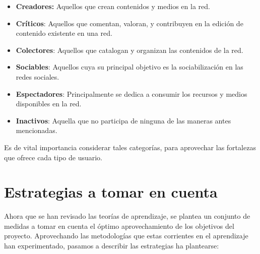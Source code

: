 \begin{itemize}
\item \textbf{Creadores:} Aquellos que crean contenidos y medios en la red.
\item \textbf{Críticos}: Aquellos que comentan, valoran, y contribuyen en la
      edición de contenido existente en una red.
\item \textbf{Colectores}: Aquellos que catalogan y organizan las contenidos de
      la red.
\item \textbf{Sociables}: Aquellos cuya su principal objetivo es la
      sociabilización en las redes sociales.
\item \textbf{Espectadores}: Principalmente se dedica a consumir los recursos y
      medios disponibles en la red.
\item \textbf{Inactivos}: Aquella que no participa de ninguna de las maneras
      antes mencionadas.
\end{itemize}

Es de vital importancia considerar tales categorías, para aprovechar las
fortalezas que ofrece cada tipo de usuario.

\section{Estrategias a tomar en cuenta}

Ahora que se han revisado las teorías de aprendizaje, se plantea un conjunto de
medidas a tomar en cuenta el óptimo aprovechamiento de los objetivos del
proyecto. Aprovechando las metodologías que estas corrientes en el aprendizaje han experimentado, pasamos a describir las estrategias ha plantearse:

